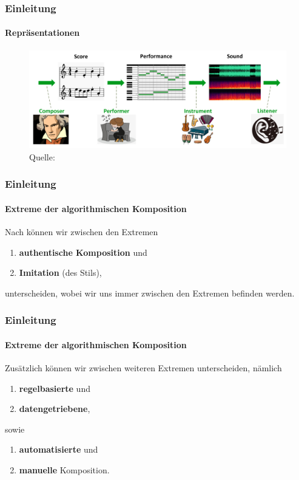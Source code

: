 \documentclass[aspectratio=169]{beamer}
\begin{document}
\begin{frame}
	\frametitle{Einleitung}
	\framesubtitle{Repräsentationen}
	\begin{figure}
		\includegraphics[width=\textwidth]{overview}
		\caption{Quelle: \cite{shulei:2020}}
	\end{figure}
\end{frame}

\begin{frame}
	\frametitle{Einleitung}
	\framesubtitle{Extreme der algorithmischen Komposition}
	Nach \cite{nierhaus:2010} können wir zwischen den Extremen
	\begin{enumerate}[label=$\bullet$]
		\item \textbf{authentische Komposition} und
		\item \textbf{Imitation} (des Stils),
	\end{enumerate}
	unterscheiden, wobei wir uns immer zwischen den Extremen befinden werden.
\end{frame}

\begin{frame}
	\frametitle{Einleitung}
	\framesubtitle{Extreme der algorithmischen Komposition}
	Zusätzlich können wir zwischen weiteren Extremen unterscheiden, nämlich
	\begin{enumerate}[label=$\bullet$]
		\item \textbf{regelbasierte} und 
		\item \textbf{datengetriebene},
	\end{enumerate}
	sowie
	\begin{enumerate}[label=$\bullet$]
		\item \textbf{automatisierte} und 
		\item \textbf{manuelle} Komposition.
	\end{enumerate}
\end{frame}
\end{document}
